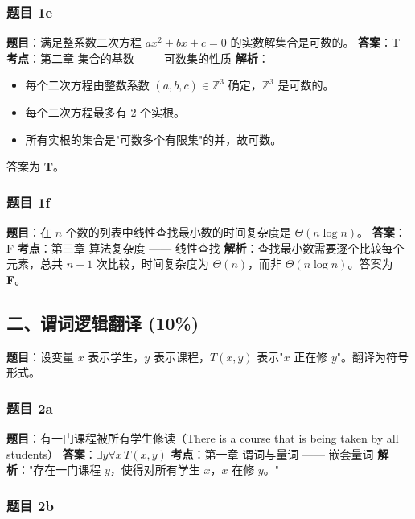 \documentclass[10pt,a4paper,openany]{ctexbook}
\theoremstyle{definition}
\theoremstyle{remark}
\begin{document}
\subsubsection{题目 1e}

\textbf{题目}：满足整系数二次方程 $ax^2 + bx + c = 0$ 的实数解集合是可数的。
\textbf{答案}：T
\textbf{考点}：第二章 集合的基数 —— 可数集的性质
\textbf{解析}：
\begin{itemize}
\item 每个二次方程由整数系数 $(a, b, c) \in \mathbb{Z}^3$ 确定，$\mathbb{Z}^3$ 是可数的。
\item 每个二次方程最多有 2 个实根。
\item 所有实根的集合是"可数多个有限集"的并，故可数。

\end{itemize}

答案为 \textbf{T}。
\vspace{-2pt}

\subsubsection{题目 1f}

\textbf{题目}：在 $n$ 个数的列表中线性查找最小数的时间复杂度是 $\Theta(n \log n)$。
\textbf{答案}：F
\textbf{考点}：第三章 算法复杂度 —— 线性查找
\textbf{解析}：查找最小数需要逐个比较每个元素，总共 $n-1$ 次比较，时间复杂度为 $\Theta(n)$，而非 $\Theta(n \log n)$。答案为 \textbf{F}。
\vspace{-2pt}

\subsection{二、谓词逻辑翻译 (10\%)}

\textbf{题目}：设变量 $x$ 表示学生，$y$ 表示课程，$T(x, y)$ 表示"$x$ 正在修 $y$"。翻译为符号形式。
\subsubsection{题目 2a}

\textbf{题目}：有一门课程被所有学生修读（There is a course that is being taken by all students）
\textbf{答案}：$\exists y \forall x\, T(x, y)$
\textbf{考点}：第一章 谓词与量词 —— 嵌套量词
\textbf{解析}："存在一门课程 $y$，使得对所有学生 $x$，$x$ 在修 $y$。"
\vspace{-2pt}

\subsubsection{题目 2b}
\end{document}
